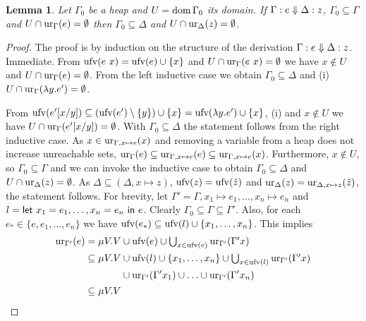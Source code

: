 \documentclass[preprint]{sigplanconf}
\newtheorem{lemma}[theorem]{Lemma}
\theoremstyle{nonumberplain}
\newtheorem{proof}{Proof}
\begin{document}
\begin{lemma}
Let $\Gamma_0$ be a heap and $U= \text{dom}\,\Gamma_0$ its domain. If $\Gamma : e \Downarrow \Delta : z$, $\Gamma_0 \subseteq \Gamma$ and $U \cap \text{ur}_{\Gamma}(e) = \emptyset$ then $\Gamma_0 \subseteq \Delta$ and  $U \cap \text{ur}_{\Delta}(z)=\emptyset$.
\label{lem:deepdup}
\end{lemma}
\begin{proof}
The proof is by induction on the structure of the derivation $\Gamma : e \Downarrow \Delta : z$.
Immediate.
From $\text{ufv}(e\ x) = \text{ufv}(e) \cup \{x\}$ and $U \cap \text{ur}_{\Gamma}(e\ x)= \emptyset$ we have $x\notin U$ and $U \cap \text{ur}_{\Gamma}(e) = \emptyset$. From the left inductive case we obtain $\Gamma_0 \subseteq \Delta$ and (i) $U \cap \text{ur}_{\Gamma}(\lambda y. e')= \emptyset$.

From $\text{ufv}(e'[x/y]) \subseteq (\text{ufv}(e')\setminus \{y\}) \cup \{x\} = \text{ufv}(\lambda y.e') \cup \{x\}$, (i) and $x\notin U$ we have $U \cap \text{ur}_{\Gamma}(e'[x/y]) = \emptyset$. With $\Gamma_0 \subseteq \Delta$ the statement follows from the right inductive case.
As $x \in \text{ur}_{\Gamma,x \mapsto e}(x)$ and removing a variable from a heap does not increase unreachable sets, $\text{ur}_{\Gamma}(e) \subseteq \text{ur}_{\Gamma, x\mapsto e}(e) \subseteq \text{ur}_{\Gamma,x\mapsto e}(x)$. Furthermore, $x \notin U$, so $\Gamma_0 \subseteq \Gamma$ and we can invoke the inductive case to obtain $\Gamma_0 \subseteq \Delta$ and $U \cap \text{ur}_{\Delta}(z) = \emptyset$. As $\Delta \subseteq (\Delta, x \mapsto z)$, $\text{ufv}(z) = \text{ufv}(\hat z)$ and $\text{ur}_{\Delta}(z) = \text{ur}_{\Delta, x \mapsto z}(\hat z)$, the statement follows.
For brevity, let $\Gamma' = \Gamma,x_1\mapsto e_1,\ldots,x_n\mapsto e_n$ and $l = \text{\textsf{let}}\ x_1=e_1,\ldots,x_n=e_n\ \text{\textsf{in}}\ e$.
Clearly $\Gamma_0 \subseteq \Gamma \subseteq \Gamma'$.
Also, for each $e_* \in \{e,e_1,\ldots,e_n\}$ we have $\text{ufv}(e_*) \subseteq \text{ufv}(l) \cup \{x_1,\ldots,x_n\}$. This implies 
\begin{align*}
\ur{\Gamma'}e
&= \mu V. V \cup \ufv e \cup \textstyle\bigcup_{x\in \ufv e}\ur{\Gamma'}{\Gamma' x} \\
&\subseteq \mu V. V
\begin{aligned}[t]
&\cup \ufv l \cup \{x_1,\ldots,x_n\} \cup \textstyle\bigcup_{x\in \ufv l}\ur{\Gamma'}{\Gamma' x} \\
&\cup \ur{\Gamma'}{\Gamma' x_1} \cup \ldots \cup \ur{\Gamma'}{\Gamma' x_n}
\end{aligned}\\
&\subseteq \mu V. V
\begin{aligned}[t]

\end{aligned}
\end{align*}
\end{proof}
\end{document}

